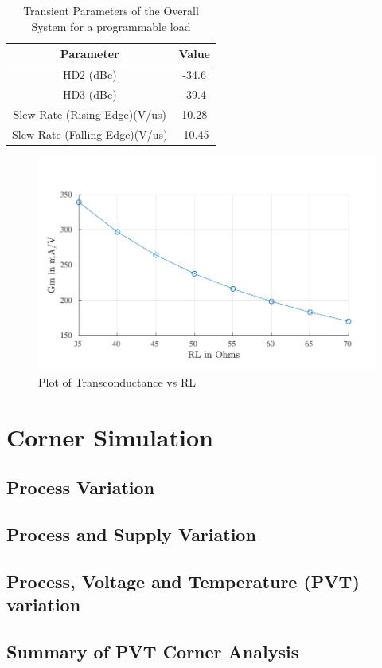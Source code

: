 \begin{table} [H]
\centering
\begin{tabular}{@{}cc@{}}
\toprule
Parameter							& Value		\\ \midrule
HD2 (dBc)							& -34.6 			\\
HD3 (dBc)							& -39.4 			\\
Slew Rate (Rising Edge)(V/us)		& 10.28 			\\
Slew Rate (Falling Edge)(V/us)		& -10.45 			\\
\bottomrule
\end{tabular}
\caption{Transient Parameters of the Overall System for a programmable load}
\end{table}

\begin{figure} [H]
\centering
\includegraphics[scale=1]{Figures/Plots/Ov_Gm_RL.pdf}
\caption{Plot of Transconductance vs RL}
\end{figure}

\section{Corner Simulation}
\subsection{Process Variation}
\subsection{Process and Supply Variation}
\subsection{Process, Voltage and Temperature (PVT) variation}
\subsection{Summary of PVT Corner Analysis}